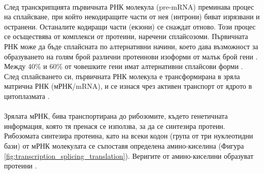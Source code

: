 \documentclass[pdftex,cyrillic,14pt,a4page,twoside,openright]{extreport}
\begin{document}
\paragraph{}
След транскрипцията първичната РНК молекула (pre-mRNA) преминава процес на сплайсване, при който некодиращите части от нея (интрони) биват изрязвани и остранени. Останалите кодиращи части (екзони) се снаждат отново. Този процес се осъществява от комплекси от протеини, наречени сплайсозоми. Първичната РНК може да бъде сплайсната по алтернативни начини, което дава възможност за образуването на голям брой различни протеинови изоформи от малък брой гени \cite{stamm2005}. Между 40\% и 60\% от човешките гени имат алтернативни сплайсови форми \cite{modrek2002}. След сплайсването си, първичната РНК молекула е трансформирана в зряла матрична РНК (мРНК/mRNA), и се изнася чрез активен транспорт от ядрото в цитоплазмата \cite{siebrasse2012}.

\paragraph{}
Зрялата мРНК, бива транспортирана до рибозомите, където генетичната информация, която тя пренася се използва, за да се синтезира протеин. Рибозомата синтезира протеина, като на всеки кодон (група от три нуклеотидни бази) от мРНК молекулата се съпоставя определена амино-киселина (Фигура \ref{fig:transcription_splicing_translation}). Веригите от амино-киселини образуват протеини \cite{klug2014translation}.
\end{document}
